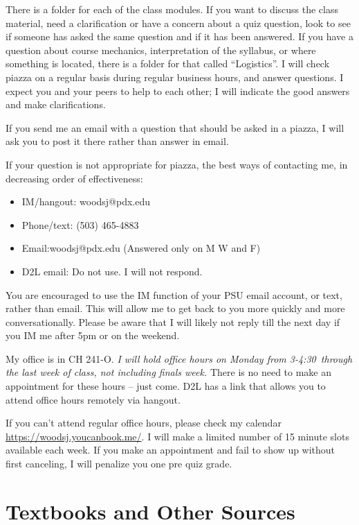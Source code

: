 \documentclass[letterpaper,10pt]{article}
\newcommand{\Office}{on Monday from 3-4:30}
\begin{document}
There is a folder for each of the class modules. If you want to discuss the class material, need a clarification or have a concern about a quiz question, look to see if someone has asked the same question and if it has been answered.  If you have a question about course mechanics, interpretation of the syllabus, or where something is located, there is a folder for that called ``Logistics''. I will check piazza on a regular basis during regular business hours, and answer questions. I expect you and your peers to help to each other; I will indicate the good answers and make clarifications.  

If you send me an email with a question that should be asked in a piazza, I
will ask you to post it there rather than answer in email.

If your question is not appropriate for piazza, the best ways of contacting me, in
decreasing order of effectiveness:
\begin{itemize}
\item IM/hangout: woodsj@pdx.edu
\item Phone/text: (503) 465-4883
\item Email:woodsj@pdx.edu (Answered only on M W and F)
\item D2L email: Do not use.  I will not respond.
\end{itemize}

You are encouraged to use the IM function of your PSU email account, or text, rather than email. This will allow me to get back to you more quickly and more conversationally. Please be aware that I will likely not reply till the next day if you IM me after 5pm or on the weekend.  

My office is in CH 241-O.  \emph{I will hold office hours \Office ~through the last week of class, not including finals week.} There is no need to make an appointment for these hours -- just come.  D2L has a link that allows you to attend office hours remotely via hangout.

If you can’t attend regular office hours, please check my calendar \url{https://woodsj.youcanbook.me/}. I will make a limited number of 15 minute slots available each week. If you make an appointment and fail to show up without first canceling, I will penalize you one pre quiz grade.  


 
\section{Textbooks and Other Sources}
\end{document}
